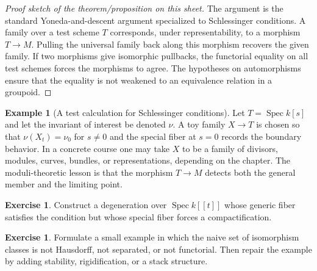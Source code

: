 \documentclass[11pt]{amsart}
\theoremstyle{definition}
\newtheorem{example}[theorem]{Example}
\newtheorem{exercise}[theorem]{Exercise}
\newcommand{\Spec}{\operatorname{Spec}}
\begin{document}
\begin{proof}[Proof sketch of the theorem/proposition on this sheet]
The argument is the standard Yoneda-and-descent argument specialized to Schlessinger conditions.  A family over a test scheme $T$ corresponds, under representability, to a morphism $T\to M$.  Pulling the universal family back along this morphism recovers the given family.  If two morphisms give isomorphic pullbacks, the functorial equality on all test schemes forces the morphisms to agree.  The hypotheses on automorphisms ensure that the equality is not weakened to an equivalence relation in a groupoid.
\end{proof}
\begin{example}[A test calculation for Schlessinger conditions]
Let $T=\Spec k[s]$ and let the invariant of interest be denoted $\nu$.  A toy family $X\to T$ is chosen so that $\nu(X_t)=\nu_0$ for $s\ne0$ and the special fiber at $s=0$ records the boundary behavior.  In a concrete course one may take $X$ to be a family of divisors, modules, curves, bundles, or representations, depending on the chapter.  The moduli-theoretic lesson is that the morphism $T\to M$ detects both the general member and the limiting point.
\end{example}
\begin{exercise}
Construct a degeneration over $\Spec k[[t]]$ whose generic fiber satisfies the condition but whose special fiber forces a compactification.
\end{exercise}
\begin{exercise}
Formulate a small example in which the naive set of isomorphism classes is not Hausdorff, not separated, or not functorial.  Then repair the example by adding stability, rigidification, or a stack structure.
\end{exercise}
\clearpage
\end{document}
